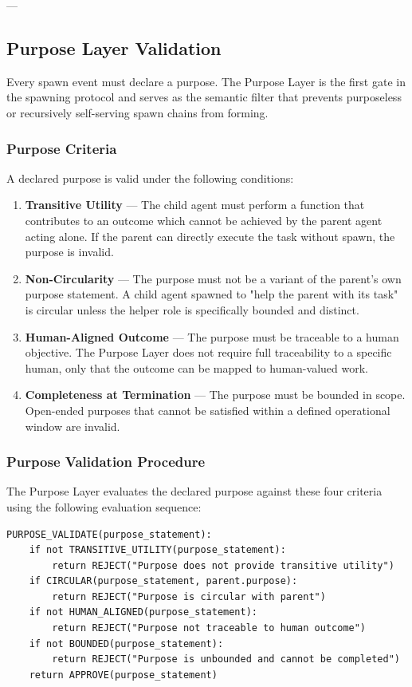 ---

\subsection{Purpose Layer Validation}

Every spawn event must declare a purpose. The Purpose Layer is the first gate in the spawning protocol and serves as the semantic filter that prevents purposeless or recursively self-serving spawn chains from forming.

\subsubsection{Purpose Criteria}

A declared purpose is valid under the following conditions:

\begin{enumerate}
    \item \textbf{Transitive Utility} — The child agent must perform a function that contributes to an outcome which cannot be achieved by the parent agent acting alone. If the parent can directly execute the task without spawn, the purpose is invalid.
    \item \textbf{Non-Circularity} — The purpose must not be a variant of the parent's own purpose statement. A child agent spawned to "help the parent with its task" is circular unless the helper role is specifically bounded and distinct.
    \item \textbf{Human-Aligned Outcome} — The purpose must be traceable to a human objective. The Purpose Layer does not require full traceability to a specific human, only that the outcome can be mapped to human-valued work.
    \item \textbf{Completeness at Termination} — The purpose must be bounded in scope. Open-ended purposes that cannot be satisfied within a defined operational window are invalid.
\end{enumerate}

\subsubsection{Purpose Validation Procedure}

The Purpose Layer evaluates the declared purpose against these four criteria using the following evaluation sequence:

\begin{verbatim}
PURPOSE_VALIDATE(purpose_statement):
    if not TRANSITIVE_UTILITY(purpose_statement):
        return REJECT("Purpose does not provide transitive utility")
    if CIRCULAR(purpose_statement, parent.purpose):
        return REJECT("Purpose is circular with parent")
    if not HUMAN_ALIGNED(purpose_statement):
        return REJECT("Purpose not traceable to human outcome")
    if not BOUNDED(purpose_statement):
        return REJECT("Purpose is unbounded and cannot be completed")
    return APPROVE(purpose_statement)
\end{verbatim}

